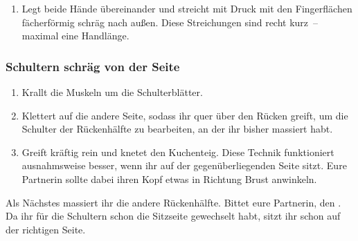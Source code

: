 \begin{oframed}
  \begin{enumerate}
    \item {} Legt beide Hände übereinander und streicht mit Druck mit den Fingerflächen fächerförmig schräg nach außen. Diese Streichungen sind recht kurz~-- maximal eine Handlänge.
    \iftoggle{oel}{
      \item \fett{Daumenstreichungen:} Streicht mit beiden Daumen fächerförmig mit viel Druck nach außen. Die Daumen zeigen dabei in Richtung des Kopfes. Diese Streichungen sind sehr kurz~-- etwa eine halbe Handlänge. Achtung, manchen Menschen ist diese Technik zu intensiv.
    }{
      \item \fett{Daumendruck:} Drückt mit den Daumenspitzen punktuell zwischen den Schulterblättern auf die Muskeln. Achtung, manchen Menschen ist diese Technik zu intensiv.
    }
  \end{enumerate}
\end{oframed}

\subsubsection{Schultern schräg von der Seite}

\begin{oframed}
  \begin{enumerate}
    \item {} Krallt die Muskeln um die Schulterblätter.
    \iftoggle{long}{
      \item \fett{Zwischen Schulterblatt und Rippen:} Hebt das Schulterblatt und den Ellenbogen eurer Partnerin an und stützt diese mit einem Arm (und bei Bedarf mit eurem Knie). Massiert dann mit der Fingerspitzen mit viel Druck unter dem Schulterblatt entlang.
    }{}
    \item {} Klettert auf die andere Seite, sodass ihr quer über den Rücken greift, um die Schulter der Rückenhälfte zu bearbeiten, an der ihr bisher massiert habt.
    \item {} Greift kräftig rein und knetet den Kuchenteig. Diese Technik funktioniert ausnahmsweise besser, wenn ihr auf der gegenüberliegenden Seite sitzt. Eure Partnerin sollte dabei ihren Kopf etwas in Richtung Brust anwinkeln.
  \end{enumerate}
\end{oframed}

Als Nächstes massiert ihr die andere Rückenhälfte. Bittet eure Partnerin, den . Da ihr für die Schultern schon die Sitzseite gewechselt habt, sitzt ihr schon auf der richtigen Seite.

